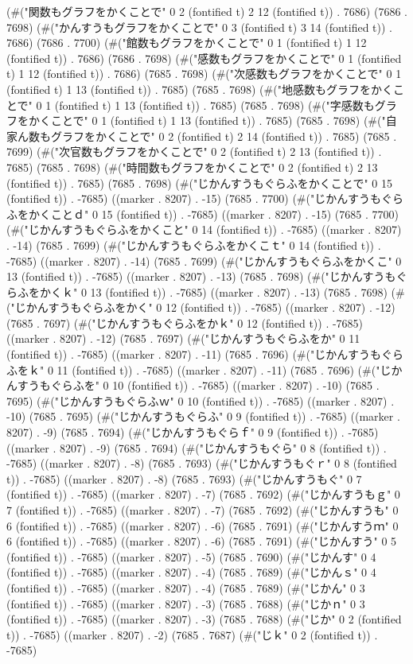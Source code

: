 (#("関数もグラフをかくことで" 0 2 (fontified t) 2 12 (fontified t)) . 7686) (7686 . 7698) (#("かんすうもグラフをかくことで" 0 3 (fontified t) 3 14 (fontified t)) . 7686) (7686 . 7700) (#("館数もグラフをかくことで" 0 1 (fontified t) 1 12 (fontified t)) . 7686) (7686 . 7698) (#("感数もグラフをかくことで" 0 1 (fontified t) 1 12 (fontified t)) . 7686) (7685 . 7698) (#("次感数もグラフをかくことで" 0 1 (fontified t) 1 13 (fontified t)) . 7685) (7685 . 7698) (#("地感数もグラフをかくことで" 0 1 (fontified t) 1 13 (fontified t)) . 7685) (7685 . 7698) (#("字感数もグラフをかくことで" 0 1 (fontified t) 1 13 (fontified t)) . 7685) (7685 . 7698) (#("自家ん数もグラフをかくことで" 0 2 (fontified t) 2 14 (fontified t)) . 7685) (7685 . 7699) (#("次官数もグラフをかくことで" 0 2 (fontified t) 2 13 (fontified t)) . 7685) (7685 . 7698) (#("時間数もグラフをかくことで" 0 2 (fontified t) 2 13 (fontified t)) . 7685) (7685 . 7698) (#("じかんすうもぐらふをかくことで" 0 15 (fontified t)) . -7685) ((marker . 8207) . -15) (7685 . 7700) (#("じかんすうもぐらふをかくことｄ" 0 15 (fontified t)) . -7685) ((marker . 8207) . -15) (7685 . 7700) (#("じかんすうもぐらふをかくこと" 0 14 (fontified t)) . -7685) ((marker . 8207) . -14) (7685 . 7699) (#("じかんすうもぐらふをかくこｔ" 0 14 (fontified t)) . -7685) ((marker . 8207) . -14) (7685 . 7699) (#("じかんすうもぐらふをかくこ" 0 13 (fontified t)) . -7685) ((marker . 8207) . -13) (7685 . 7698) (#("じかんすうもぐらふをかくｋ" 0 13 (fontified t)) . -7685) ((marker . 8207) . -13) (7685 . 7698) (#("じかんすうもぐらふをかく" 0 12 (fontified t)) . -7685) ((marker . 8207) . -12) (7685 . 7697) (#("じかんすうもぐらふをかｋ" 0 12 (fontified t)) . -7685) ((marker . 8207) . -12) (7685 . 7697) (#("じかんすうもぐらふをか" 0 11 (fontified t)) . -7685) ((marker . 8207) . -11) (7685 . 7696) (#("じかんすうもぐらふをｋ" 0 11 (fontified t)) . -7685) ((marker . 8207) . -11) (7685 . 7696) (#("じかんすうもぐらふを" 0 10 (fontified t)) . -7685) ((marker . 8207) . -10) (7685 . 7695) (#("じかんすうもぐらふｗ" 0 10 (fontified t)) . -7685) ((marker . 8207) . -10) (7685 . 7695) (#("じかんすうもぐらふ" 0 9 (fontified t)) . -7685) ((marker . 8207) . -9) (7685 . 7694) (#("じかんすうもぐらｆ" 0 9 (fontified t)) . -7685) ((marker . 8207) . -9) (7685 . 7694) (#("じかんすうもぐら" 0 8 (fontified t)) . -7685) ((marker . 8207) . -8) (7685 . 7693) (#("じかんすうもぐｒ" 0 8 (fontified t)) . -7685) ((marker . 8207) . -8) (7685 . 7693) (#("じかんすうもぐ" 0 7 (fontified t)) . -7685) ((marker . 8207) . -7) (7685 . 7692) (#("じかんすうもｇ" 0 7 (fontified t)) . -7685) ((marker . 8207) . -7) (7685 . 7692) (#("じかんすうも" 0 6 (fontified t)) . -7685) ((marker . 8207) . -6) (7685 . 7691) (#("じかんすうｍ" 0 6 (fontified t)) . -7685) ((marker . 8207) . -6) (7685 . 7691) (#("じかんすう" 0 5 (fontified t)) . -7685) ((marker . 8207) . -5) (7685 . 7690) (#("じかんす" 0 4 (fontified t)) . -7685) ((marker . 8207) . -4) (7685 . 7689) (#("じかんｓ" 0 4 (fontified t)) . -7685) ((marker . 8207) . -4) (7685 . 7689) (#("じかん" 0 3 (fontified t)) . -7685) ((marker . 8207) . -3) (7685 . 7688) (#("じかｎ" 0 3 (fontified t)) . -7685) ((marker . 8207) . -3) (7685 . 7688) (#("じか" 0 2 (fontified t)) . -7685) ((marker . 8207) . -2) (7685 . 7687) (#("じｋ" 0 2 (fontified t)) . -7685) 